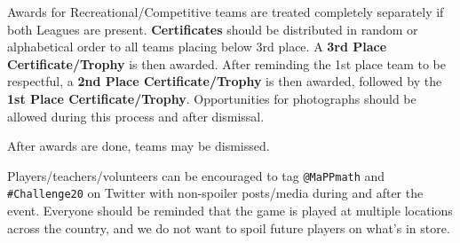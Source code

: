 Awards for Recreational/Competitive teams are treated completely separately
if both Leagues are present.
\textbf{Certificates} should be distributed in 
random or alphabetical order to all teams placing
below 3rd place. A \textbf{3rd Place Certificate/Trophy} is then awarded.
After reminding the 1st place team to be respectful, a
\textbf{2nd Place Certificate/Trophy} is then awarded, followed by the
\textbf{1st Place Certificate/Trophy}. Opportunities for photographs should
be allowed during this process and after dismissal.

After awards are done, teams may be dismissed.


Players/teachers/volunteers can be encouraged to tag \texttt{@MaPPmath}
and \texttt{\#Challenge20} on Twitter with non-spoiler posts/media during
and after the event. Everyone should be reminded that the game is played
at multiple locations across the country, and we do not want to spoil
future players on what's in store.

